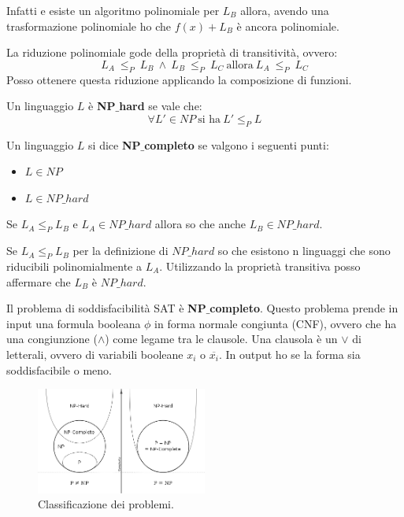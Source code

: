 \begin{dimostrazione}
    Infatti e esiste un algoritmo polinomiale per $L_B$ allora, avendo una
    trasformazione polinomiale ho che $f(x) + L_B$ è ancora polinomiale.
\end{dimostrazione}
\begin{teorema}
    La riduzione polinomiale gode della proprietà di transitività, ovvero:
    \begin{equation}
        L_A \ \leq_P \ L_B \ \land \ L_B \ \leq_P \ L_C \ \text{allora} \ L_A
        \ \leq_P \ L_C
    \end{equation}
    Posso ottenere questa riduzione applicando la composizione di funzioni.
\end{teorema}
\begin{definizione}
    Un linguaggio $L$ è \textbf{NP}$\_$\textbf{hard} se vale che:
    \begin{equation}
        \forall L' \in NP \ \text{si ha} \ L' \leq_P L
    \end{equation}
\end{definizione}
\begin{definizione}
    Un linguaggio $L$ si dice \textbf{NP}$\_$\textbf{completo} se valgono i
    seguenti punti:
    \begin{itemize}
        \item $L \in NP$
        \item $L \in NP\_hard$
    \end{itemize}
\end{definizione}
\begin{teorema}
    Se $L_A \leq_P L_B$ e $L_A \in NP\_hard$ allora so che anche $L_B \in NP\_hard$.
\end{teorema}
\begin{dimostrazione}
    Se $L_A \leq_P L_B$ per la definizione di $NP\_hard$ so che esistono n
    linguaggi che sono riducibili polinomialmente a $L_A$. Utilizzando la
    proprietà transitiva posso affermare che $L_B$ è $NP\_hard$.
\end{dimostrazione}
\begin{teorema}
    Il problema di soddisfacibilità SAT è \textbf{NP}$\_$\textbf{completo}.
    Questo problema prende in input una formula booleana $\phi$ in forma normale
    congiunta (CNF), ovvero che ha una congiunzione ($\land$) come legame tra le
    clausole. Una clausola è un $\lor$ di letterali, ovvero di variabili booleane
    $x_i$ o $\overline{x_i}$. In output ho se la forma sia soddisfacibile o meno.
\end{teorema}
\begin{figure}[!ht]
    \centering
    \includegraphics[width=0.5\textwidth]{img/MacchineTuring/classificazioneProblemi.png}
    \caption{Classificazione dei problemi.}
\end{figure}